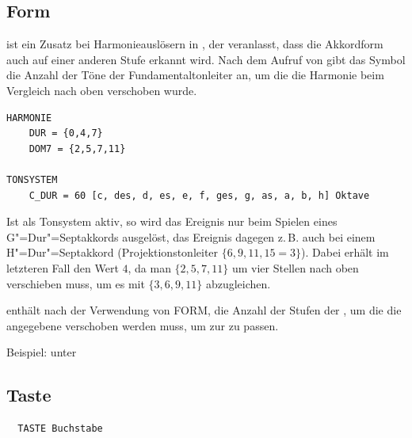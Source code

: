 \subsection{Form}
\label{sec:SX_SHIFTED}

 ist ein Zusatz bei Harmonieauslösern in
, der veranlasst, dass die Akkordform
auch auf einer anderen Stufe erkannt wird. Nach dem Aufruf von
 gibt das Symbol  die Anzahl der Töne
der Fundamentaltonleiter an, um die die Harmonie beim Vergleich nach
oben verschoben wurde.




\begin{verbatim}
HARMONIE  
    DUR = {0,4,7}  
    DOM7 = {2,5,7,11}

TONSYSTEM  
    C_DUR = 60 [c, des, d, es, e, f, ges, g, as, a, b, h] Oktave
\end{verbatim}



Ist  als Tonsystem aktiv, so wird das Ereignis  nur 
beim Spielen eines G"=Dur"=Septakkords ausgelöst, das Ereignis 
 dagegen z.\,B. auch bei einem H"=Dur"=Septakkord (Projektionstonleiter 
$\{6,9,11,15=3\}$). Dabei erhält im letzteren Fall  den 
Wert $4$, da man $\{2,5,7,11\}$ um vier Stellen nach oben verschieben 
muss, um es mit $\{3,6,9,11\}$ abzugleichen. 


\label{sec:SX_DISTANCE}

 enthält nach der Verwendung von FORM, die Anzahl der
Stufen der , um
die die angegebene  verschoben werden muss, um zur
 zu passen.


Beispiel: unter 


\subsection{Taste}
\label{sec:SX_KEY}



\begin{verbatim}
  TASTE Buchstabe
\end{verbatim}





